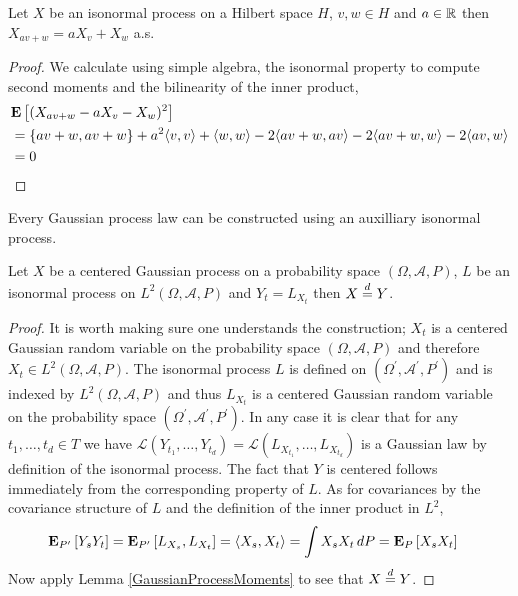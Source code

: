 \begin{prop}\label{LinearityIsonormalProcess} Let $X$ be an isonormal process on a Hilbert space $H$, $v, w \in H$ and $a \in \reals$ then $X_{av + w} = a X_v + X_w$ a.s. 
\end{prop}
\begin{proof}
We calculate using simple algebra, the isonormal property to compute second moments and the bilinearity of the inner product,
\begin{align*}
&\expectation{(X_{av + w} - a X_v - X_w)^2} \\ 
&= \lbrace av + w, av + w \rbrace + a^2 \langle v,v \rangle + \langle w, w \rangle - 2 \langle av + w, av \rangle - 2 \langle av + w, w \rangle - 2 \langle av, w \rangle \\
&= 0
\end{align*}
\end{proof}

Every Gaussian process law can be constructed using an auxilliary isonormal process.
\begin{prop}\label{IsonormalRepresentationOfGaussian} Let $X$ be a centered Gaussian process on a probability space $(\Omega, \mathcal{A}, P)$, $L$ be an isonormal process on $L^2(\Omega, \mathcal{A}, P)$ and $Y_t = L_{X_t}$ then $X \eqdist Y$.
\end{prop}
\begin{proof}
It is worth making sure one understands the construction; $X_t$ is a centered Gaussian random variable on the probability space $(\Omega, \mathcal{A}, P)$ and therefore $X_t \in L^2(\Omega, \mathcal{A}, P)$.  The isonormal process $L$ is defined on $(\Omega^\prime, \mathcal{A}^\prime, P^\prime)$ and is indexed by $L^2(\Omega, \mathcal{A}, P)$ and thus $L_{X_t}$ is a centered Gaussian random variable on the probability space $(\Omega^\prime, \mathcal{A}^\prime, P^\prime)$.  In any case it is clear that for any $t_1,\dotsc,t_d \in T$ we have $\mathcal{L}(Y_{t_1}, \dotsc, Y_{t_d}) = \mathcal{L}(L_{X_{t_1}}, \dotsc, L_{X_{t_d}})$ is a Gaussian law by definition of the isonormal process.  The fact that $Y$ is centered follows immediately from the corresponding property of $L$.  As for covariances by the covariance structure of $L$ and the definition of the inner product in $L^2$,
\begin{align*}
\sexpectation{Y_s Y_t}{P^\prime} &= \sexpectation{L_{X_s}, L_{X_t}}{P^\prime} = \langle X_s, X_t \rangle = \int X_s X_t \, dP = \sexpectation{X_s X_t}{P}
\end{align*}
Now apply Lemma \ref{GaussianProcessMoments} to see that $X \eqdist Y$.
\end{proof}

